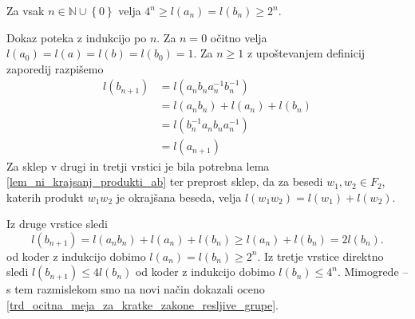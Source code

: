 \begin{lema}
\label{lem_ocena_dolzine_clenov_zaporedij_ab}
Za vsak $n \in \mathbb{N} \cup \left\{ 0\right\}$ velja $4^{n} \ge l(a_{n}) = l(b_{n}) \ge 2^{n}$.
\end{lema}
\begin{dokaz}
    Dokaz poteka z indukcijo po $n$. Za $n = 0$ očitno velja $l(a_0) = l(a) = l(b) = l(b_0) = 1$. Za $n \ge 1$ z upoštevanjem definicij zaporedij razpišemo \begin{align*}
    l(b_{n+1}) &= l(a_{n} b_{n} a_{n}^{-1} b_{n}^{-1}) \\
     &= l(a_{n} b_{n}) + l(a_{n}) + l(b_{n}) \\
     &= l(b_{n}^{-1} a_{n} b_{n} a_{n}^{-1}) \\
     &= l(a_{n + 1})
\end{align*}
Za sklep v drugi in tretji vrstici je bila potrebna lema \ref{lem_ni_krajsanj_produkti_ab} ter preprost sklep, da za besedi $w_1, w_2 \in F_2$, katerih produkt $w_1 w_2$ je okrajšana beseda, velja $l(w_1 w_2) = l(w_1) + l(w_2)$.

Iz druge vrstice sledi \begin{equation*}
    l(b_{n+1}) = l(a_n b_n) + l(a_n)  + l(b_n) \ge l(a_n)  + l(b_n) = 2l(b_n).
\end{equation*}
od koder z indukcijo dobimo $l(a_{n}) = l(b_{n}) \ge 2^{n}$. Iz tretje vrstice direktno sledi $l(b_{n+1}) \le 4 l(b_n)$
od koder z indukcijo dobimo $l(b_n) \le 4^{n}$. Mimogrede -- s tem razmislekom smo na novi način dokazali oceno \ref{trd_ocitna_meja_za_kratke_zakone_resljive_grupe}.    
\end{dokaz}

